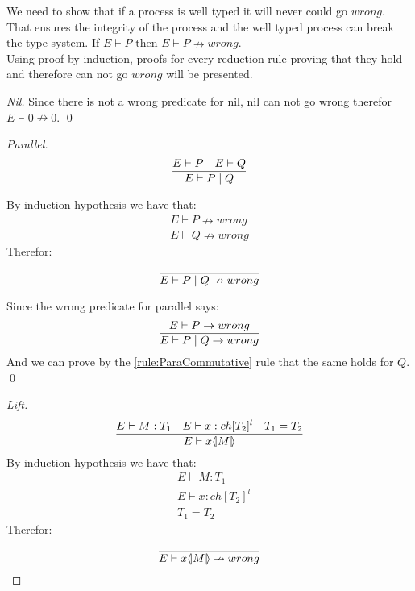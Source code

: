 \begin{theorem}
We need to show that if a process is well typed it will never could go $wrong$. That ensures the integrity of the process and the well typed process can break the type system.
    If $E \vdash P$ then $E \vdash P \nrightarrow wrong$.\\
    Using proof by induction, proofs for every reduction rule proving that they hold and therefore can not go $wrong$ will be presented.

    \begin{proof}[Nil]
        Since there is not a wrong predicate for nil, nil can not go wrong therefor $E \vdash 0 \nrightarrow 0$.
        \qed
    \end{proof}

    \begin{proof}[Parallel]
        \begin{align*}
            \frac{E \vdash P \quad E \vdash Q }{E \vdash P \mid Q}
        \end{align*}

        By induction hypothesis we have that: 
        \begin{align*}
            E \vdash P \nrightarrow wrong\\
            E \vdash Q \nrightarrow wrong
        \end{align*}
        Therefor:
        \begin{align*}
            \frac{}{E \vdash P \mid Q \nrightarrow wrong}
        \end{align*}

        Since the wrong predicate for parallel says:
        \begin{align*}
            \frac{E \vdash P \rightarrow wrong}{E \vdash P \mid Q \rightarrow wrong}
        \end{align*}
        And we can prove by the \ref{rule:ParaCommutative} rule that the same holds for $Q$.\\
        \qed
    \end{proof}

    \begin{proof}[Lift]
        \begin{align*}
            \frac{E \vdash M:T_1 \quad E \vdash x:ch[T_2]^l \quad T_1 = T_2}{E \vdash x \langle \! | M | \! \rangle}
        \end{align*}
        By induction hypothesis we have that:
        \begin{align*}
            &E \vdash M:T_1\\
            &E \vdash x:ch[T_2]^l\\
            &T_1 = T_2
        \end{align*}
        Therefor:
        \begin{align*}
            \frac{}{E \vdash x \langle \! | M | \! \rangle \nrightarrow wrong}
        \end{align*}


\end{proof}
\end{theorem}
